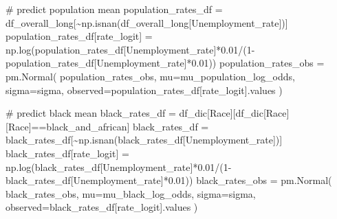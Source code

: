 \documentclass[
]{agujournal2019}
\newenvironment{Shaded}{\begin{snugshade}}{\end{snugshade}}
\newcommand{\CommentTok}[1]{\textcolor[rgb]{0.37,0.37,0.37}{#1}}
\newcommand{\DecValTok}[1]{\textcolor[rgb]{0.68,0.00,0.00}{#1}}
\newcommand{\FloatTok}[1]{\textcolor[rgb]{0.68,0.00,0.00}{#1}}
\newcommand{\NormalTok}[1]{\textcolor[rgb]{0.00,0.23,0.31}{#1}}
\newcommand{\OperatorTok}[1]{\textcolor[rgb]{0.37,0.37,0.37}{#1}}
\newcommand{\StringTok}[1]{\textcolor[rgb]{0.13,0.47,0.30}{#1}}
\begin{document}
\begin{Shaded}
\begin{Highlighting}[]
    \CommentTok{\# predict population mean}
\NormalTok{    population\_rates\_df }\OperatorTok{=}\NormalTok{ df\_overall\_long[}\OperatorTok{\textasciitilde{}}\NormalTok{np.isnan(df\_overall\_long[}\StringTok{\textquotesingle{}Unemployment\_rate\textquotesingle{}}\NormalTok{])]}
\NormalTok{    population\_rates\_df[}\StringTok{\textquotesingle{}rate\_logit\textquotesingle{}}\NormalTok{] }\OperatorTok{=}\NormalTok{ np.log(population\_rates\_df[}\StringTok{\textquotesingle{}Unemployment\_rate\textquotesingle{}}\NormalTok{]}\OperatorTok{*}\FloatTok{0.01}\OperatorTok{/}\NormalTok{(}\DecValTok{1}\OperatorTok{{-}}\NormalTok{population\_rates\_df[}\StringTok{\textquotesingle{}Unemployment\_rate\textquotesingle{}}\NormalTok{]}\OperatorTok{*}\FloatTok{0.01}\NormalTok{))}
\NormalTok{    population\_rates\_obs }\OperatorTok{=}\NormalTok{ pm.Normal(}
        \StringTok{\textquotesingle{}population\_rates\_obs\textquotesingle{}}\NormalTok{,}
\NormalTok{        mu}\OperatorTok{=}\NormalTok{mu\_population\_log\_odds, }
\NormalTok{        sigma}\OperatorTok{=}\NormalTok{sigma,}
\NormalTok{        observed}\OperatorTok{=}\NormalTok{population\_rates\_df[}\StringTok{\textquotesingle{}rate\_logit\textquotesingle{}}\NormalTok{].values}
\NormalTok{    )}

    \CommentTok{\# predict black mean}
\NormalTok{    black\_rates\_df }\OperatorTok{=}\NormalTok{ df\_dic[}\StringTok{\textquotesingle{}Race\textquotesingle{}}\NormalTok{][df\_dic[}\StringTok{\textquotesingle{}Race\textquotesingle{}}\NormalTok{][}\StringTok{\textquotesingle{}Race\textquotesingle{}}\NormalTok{]}\OperatorTok{==}\StringTok{\textquotesingle{}black\_and\_african\textquotesingle{}}\NormalTok{]}
\NormalTok{    black\_rates\_df }\OperatorTok{=}\NormalTok{ black\_rates\_df[}\OperatorTok{\textasciitilde{}}\NormalTok{np.isnan(black\_rates\_df[}\StringTok{\textquotesingle{}Unemployment\_rate\textquotesingle{}}\NormalTok{])] }
\NormalTok{    black\_rates\_df[}\StringTok{\textquotesingle{}rate\_logit\textquotesingle{}}\NormalTok{] }\OperatorTok{=}\NormalTok{ np.log(black\_rates\_df[}\StringTok{\textquotesingle{}Unemployment\_rate\textquotesingle{}}\NormalTok{]}\OperatorTok{*}\FloatTok{0.01}\OperatorTok{/}\NormalTok{(}\DecValTok{1}\OperatorTok{{-}}\NormalTok{black\_rates\_df[}\StringTok{\textquotesingle{}Unemployment\_rate\textquotesingle{}}\NormalTok{]}\OperatorTok{*}\FloatTok{0.01}\NormalTok{))}
\NormalTok{    black\_rates\_obs }\OperatorTok{=}\NormalTok{ pm.Normal(}
        \StringTok{\textquotesingle{}black\_rates\_obs\textquotesingle{}}\NormalTok{,}
\NormalTok{        mu}\OperatorTok{=}\NormalTok{mu\_black\_log\_odds, }
\NormalTok{        sigma}\OperatorTok{=}\NormalTok{sigma,}
\NormalTok{        observed}\OperatorTok{=}\NormalTok{black\_rates\_df[}\StringTok{\textquotesingle{}rate\_logit\textquotesingle{}}\NormalTok{].values}
\NormalTok{    )}


\end{Highlighting}
\end{Shaded}
\end{document}

